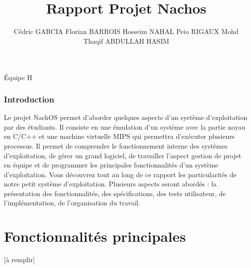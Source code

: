 \documentclass{book}
\begin{document}
\title{Rapport Projet Nachos}
Équipe H


\author{
Cédric GARCIA
Florian BARROIS
Hosseim NAHAL
Peio RIGAUX
Mohd Thaqif ABDULLAH HASIM 
}


\maketitle

\tableofcontents

\section{Introduction}


Le projet NachOS permet d’aborder quelques aspects d’un système d’exploitation par des étudiants. Il consiste en une émulation d’un système avec la partie noyau en C/C++ et une machine virtuelle MIPS qui permettra d’exécuter plusieurs processus. Il permet de comprendre le fonctionnement interne des systèmes d’exploitation, de gérer un grand logiciel, de travailler l’aspect gestion de projet en équipe et de programmer les principales fonctionnalités d’un système d’exploitation.
Vous découvrez tout au long de ce rapport les particularités de notre petit système d’exploitation.
Plusieurs aspects seront abordés : la présentation des fonctionnalités, des spécifications, des tests utilisateur, de l’implémentation, de l’organisation du travail.


\part{Fonctionnalités principales}


[à remplir]
\end{document}
